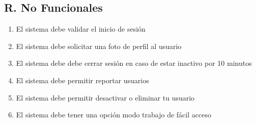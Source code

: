 \documentclass{article}
\begin{document}
\subsection{R. No Funcionales}
\begin{enumerate}
    \item El sistema debe validar el inicio de sesión
    \item El sistema debe solicitar una foto de perfil al usuario
    \item El sistema debe debe cerrar sesión en caso de estar inactivo por 10 minutos
    \item El sistema debe permitir reportar usuarios
    \item El sistema debe permitir desactivar o eliminar tu usuario
    \item El sistema debe tener una opción modo trabajo de fácil acceso
\end{enumerate}
\end{document}
